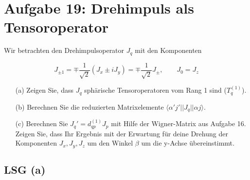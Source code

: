 


\section*{Aufgabe 19: Drehimpuls als Tensoroperator}

Wir betrachten den Drehimpulsoperator \(J_q\) mit den Komponenten

\[J_{\pm 1}=\mp \frac{1}{\sqrt{2}}(J_x\pm iJ_y) = \mp\frac{1}{\sqrt{2}}J_{\pm},\qquad J_0=J_z\]

\begin{enumerate}
\item[(a)] Zeigen Sie, dass \(J_q\) sphärische Tensoroperatoren vom Rang 1 sind (\(T^{(1)}_q\)).
\item[(b)] Berechnen Sie die reduzierten Matrixelemente \(\langle \alpha' j'||J_q||\alpha j\rangle \).
\item[(c)] Berechnen Sie \(J_q' = d^{(1)}_{qp}J_p\) mit Hilfe der Wigner-Matrix aus Aufgabe 16. Zeigen Sie, dass Ihr Ergebnis mit der Erwartung für deine Drehung der Komponenten \(J_x,J_y,J_z\) um den Winkel \(\beta\) um die y-Achse übereinstimmt.
\end{enumerate}


\subsection*{LSG (a)}





